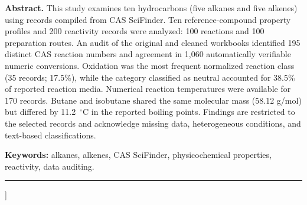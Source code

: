 {\begin{@twocolumnfalse}
\begin{minipage}{\textwidth}
\vspace{8pt}
\noindent\textbf{Abstract.} This study examines ten hydrocarbons (five alkanes and five alkenes) using records compiled from CAS SciFinder. Ten reference-compound property profiles and 200 reactivity records were analyzed: 100 reactions and 100 preparation routes. An audit of the original and cleaned workbooks identified 195 distinct CAS reaction numbers and agreement in 1,060 automatically verifiable numeric conversions. Oxidation was the most frequent normalized reaction class (35 records; 17.5\%), while the category classified as neutral accounted for 38.5\% of reported reaction media. Numerical reaction temperatures were available for 170 records. Butane and isobutane shared the same molecular mass (58.12 g/mol) but differed by 11.2~$^\circ$C in the reported boiling points. Findings are restricted to the selected records and acknowledge missing data, heterogeneous conditions, and text-based classifications.\par
\vspace{4pt}
\noindent\textbf{Keywords:} alkanes, alkenes, CAS SciFinder, physicochemical properties, reactivity, data auditing.\par
\end{minipage}
\vspace{10pt}\hrule
\vspace{17pt}
\end{@twocolumnfalse}
}]
